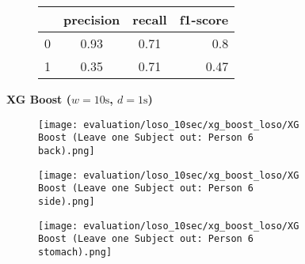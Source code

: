 \begin{figure}[ht]
    \begin{subfigure}{1\textwidth}
        \begin{center}
            \begin{tabular}{ | l | c | c | r | }
              \hline
               & precision & recall & f1-score \\ \hline
              0 & 0.93 & 0.71 & 0.8 \\ \hline
              1 & 0.35 & 0.71 & 0.47 \\
              \hline
            \end{tabular}
        \end{center}
    \end{subfigure}
    \newline
    \vspace*{1 cm}
    \newline
    \textbf{XG Boost ($w=10\si{\s}$, $d=1\si{\s}$)}
    \begin{subfigure}{1\textwidth}
      \texttt{[image: evaluation/loso\_10sec/xg\_boost\_loso/XG Boost (Leave one Subject out: Person 6 back).png]}
    \end{subfigure}
    \begin{subfigure}{1\textwidth}
      \texttt{[image: evaluation/loso\_10sec/xg\_boost\_loso/XG Boost (Leave one Subject out: Person 6 side).png]}
    \end{subfigure}
    \begin{subfigure}{1\textwidth}
      \texttt{[image: evaluation/loso\_10sec/xg\_boost\_loso/XG Boost (Leave one Subject out: Person 6 stomach).png]}
  \end{subfigure}


\end{figure}
